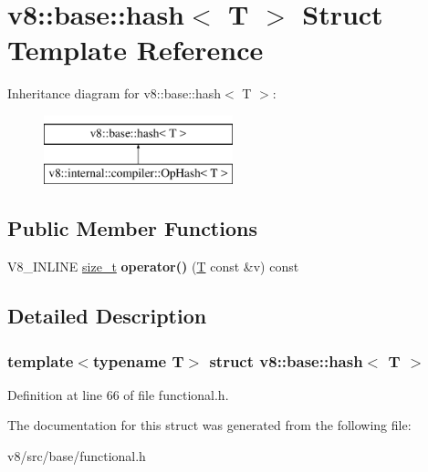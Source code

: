 \hypertarget{structv8_1_1base_1_1hash}{}\section{v8\+:\+:base\+:\+:hash$<$ T $>$ Struct Template Reference}
\label{structv8_1_1base_1_1hash}
Inheritance diagram for v8\+:\+:base\+:\+:hash$<$ T $>$\+:\begin{figure}[H]
\begin{center}
\leavevmode
\includegraphics[height=2.000000cm]{structv8_1_1base_1_1hash}
\end{center}
\end{figure}
\subsection*{Public Member Functions}
\begin{DoxyCompactItemize}
\item 
\mbox{\label{structv8_1_1base_1_1hash_a4004872020045dc87183198311bb9e04}} 
V8\+\_\+\+I\+N\+L\+I\+NE \mbox{\hyperlink{classsize__t}{size\+\_\+t}} {\bfseries operator()} (\mbox{\hyperlink{classv8_1_1internal_1_1torque_1_1T}{T}} const \&v) const
\end{DoxyCompactItemize}


\subsection{Detailed Description}
\subsubsection*{template$<$typename T$>$\newline
struct v8\+::base\+::hash$<$ T $>$}



Definition at line 66 of file functional.\+h.



The documentation for this struct was generated from the following file\+:\begin{DoxyCompactItemize}
\item 
v8/src/base/functional.\+h\end{DoxyCompactItemize}
